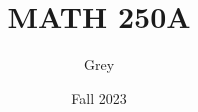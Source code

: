 \usepackage[utf8]{inputenc}
\usepackage{amsmath, amssymb, amsthm}
\usepackage{hyperref}
\usepackage{microtype}
\usepackage{mlmodern}
\usepackage{siunitx}

\author{Grey}
\title{MATH 250A}
\date{Fall 2023}

\makeatletter
\makeatother